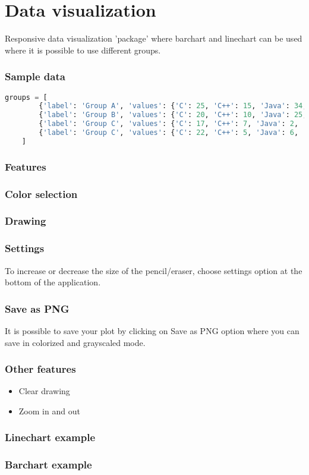 \section{Data visualization}
Responsive data visualization 'package' where barchart and linechart can be used where it is possible to use different groups.

\subsubsection*{Sample data}
\begin{lstlisting}[language=python]
    groups = [
        {'label': 'Group A', 'values': {'C': 25, 'C++': 15, 'Java': 34, 'Python': 40}},
        {'label': 'Group B', 'values': {'C': 20, 'C++': 10, 'Java': 25, 'Python': 30}},
        {'label': 'Group C', 'values': {'C': 17, 'C++': 7, 'Java': 2, 'Python': 8}},
        {'label': 'Group C', 'values': {'C': 22, 'C++': 5, 'Java': 6, 'Python': 11}}
    ]
\end{lstlisting}

\clearpage
\subsubsection*{Features}
\subsubsection*{Color selection}

\subsubsection*{Drawing}

\clearpage
\subsubsection*{Settings}
To increase or decrease the size of the pencil/eraser, choose settings option at the bottom of the application.

\subsubsection*{Save as PNG}
It is possible to save your plot by clicking on Save as PNG option where you can save in colorized and grayscaled mode.

\subsubsection*{Other features}
\begin{itemize}
    \item Clear drawing
    \item Zoom in and out
\end{itemize}

\subsubsection*{Linechart example}

\subsubsection*{Barchart example}
